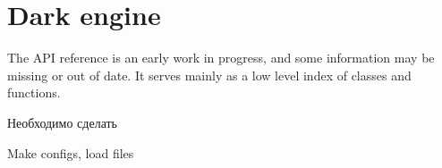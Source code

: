 \chapter{Dark engine}
\hypertarget{index}{}\label{index}
The API reference is an early work in progress, and some information may be missing or out of date. It serves mainly as a low level index of  classes and functions. \begin{DoxyRefDesc}{Необходимо сделать}
\item[\mbox{\hyperlink{todo__todo000002}{Необходимо сделать}}]Make configs, load files \end{DoxyRefDesc}
